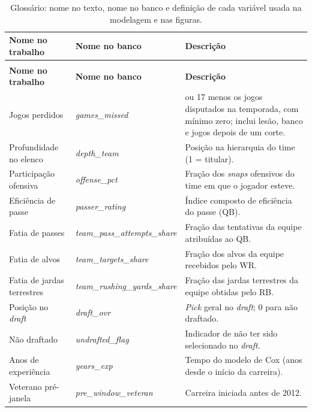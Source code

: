 \begingroup
\thesistablesetup
\setlength{\tabcolsep}{4pt}
\renewcommand{\arraystretch}{1.05}
\begin{longtable}{@{}>{\raggedright\arraybackslash}p{4.3cm}>{\raggedright\arraybackslash}p{5.6cm}>{\raggedright\arraybackslash}p{4.9cm}@{}}
\caption{Glossário: nome no texto, nome no banco e definição de cada variável usada na modelagem e nas figuras.}
\label{tab:variaveis}\\
\toprule
\textbf{Nome no trabalho} & \textbf{Nome no banco} & \textbf{Descrição} \\
\midrule
\endfirsthead
\multicolumn{3}{@{}l}{\small\textit{Tabela~\ref{tab:variaveis}, continuação.}}\\
\toprule
\textbf{Nome no trabalho} & \textbf{Nome no banco} & \textbf{Descrição} \\
\midrule
\endhead
\bottomrule
\endfoot
Jogos perdidos & \textit{games\_missed} & 16 ou 17 menos os jogos disputados na temporada, com mínimo zero; inclui lesão, banco e jogos depois de um corte. \\
Profundidade no elenco & \textit{depth\_team} & Posição na hierarquia do time (1 = titular). \\
Participação ofensiva & \textit{offense\_pct} & Fração dos \textit{snaps} ofensivos do time em que o jogador esteve. \\
Eficiência de passe & \textit{passer\_rating} & Índice composto de eficiência do passe (QB). \\
Fatia de passes & \textit{team\_pass\_\newline attempts\_share} & Fração das tentativas da equipe atribuídas ao QB. \\
Fatia de alvos & \textit{team\_targets\_share} & Fração dos alvos da equipe recebidos pelo WR. \\
Fatia de jardas terrestres & \textit{team\_rushing\_\newline yards\_share} & Fração das jardas terrestres da equipe obtidas pelo RB. \\
Posição no \textit{draft} & \textit{draft\_ovr} & \textit{Pick} geral no \textit{draft}; 0 para não draftado. \\
Não draftado & \textit{undrafted\_flag} & Indicador de não ter sido selecionado no \textit{draft}. \\
Anos de experiência & \textit{years\_exp} & Tempo do modelo de Cox (anos desde o início da carreira). \\
Veterano pré-janela & \textit{pre\_window\_veteran} & Carreira iniciada antes de 2012. \\

\end{longtable}
